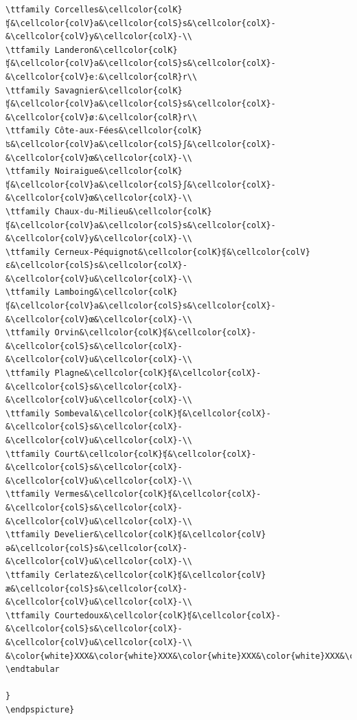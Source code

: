 \begin{verbatim}
\ttfamily Corcelles&\cellcolor{colK}ʧ&\cellcolor{colV}a&\cellcolor{colS}s&\cellcolor{colX}-&\cellcolor{colV}y&\cellcolor{colX}-\\
\ttfamily Landeron&\cellcolor{colK}ʧ&\cellcolor{colV}a&\cellcolor{colS}s&\cellcolor{colX}-&\cellcolor{colV}eː&\cellcolor{colR}r\\
\ttfamily Savagnier&\cellcolor{colK}ʧ&\cellcolor{colV}a&\cellcolor{colS}s&\cellcolor{colX}-&\cellcolor{colV}øː&\cellcolor{colR}r\\
\ttfamily Côte-aux-Fées&\cellcolor{colK}ʦ&\cellcolor{colV}a&\cellcolor{colS}ʃ&\cellcolor{colX}-&\cellcolor{colV}œ&\cellcolor{colX}-\\
\ttfamily Noiraigue&\cellcolor{colK}ʧ&\cellcolor{colV}a&\cellcolor{colS}ʃ&\cellcolor{colX}-&\cellcolor{colV}œ&\cellcolor{colX}-\\
\ttfamily Chaux-du-Milieu&\cellcolor{colK}ʧ&\cellcolor{colV}a&\cellcolor{colS}s&\cellcolor{colX}-&\cellcolor{colV}y&\cellcolor{colX}-\\
\ttfamily Cerneux-Péquignot&\cellcolor{colK}ʧ&\cellcolor{colV}ɛ&\cellcolor{colS}s&\cellcolor{colX}-&\cellcolor{colV}u&\cellcolor{colX}-\\
\ttfamily Lamboing&\cellcolor{colK}ʧ&\cellcolor{colV}a&\cellcolor{colS}s&\cellcolor{colX}-&\cellcolor{colV}œ&\cellcolor{colX}-\\
\ttfamily Orvin&\cellcolor{colK}ʧ&\cellcolor{colX}-&\cellcolor{colS}s&\cellcolor{colX}-&\cellcolor{colV}u&\cellcolor{colX}-\\
\ttfamily Plagne&\cellcolor{colK}ʧ&\cellcolor{colX}-&\cellcolor{colS}s&\cellcolor{colX}-&\cellcolor{colV}u&\cellcolor{colX}-\\
\ttfamily Sombeval&\cellcolor{colK}ʧ&\cellcolor{colX}-&\cellcolor{colS}s&\cellcolor{colX}-&\cellcolor{colV}u&\cellcolor{colX}-\\
\ttfamily Court&\cellcolor{colK}ʧ&\cellcolor{colX}-&\cellcolor{colS}s&\cellcolor{colX}-&\cellcolor{colV}u&\cellcolor{colX}-\\
\ttfamily Vermes&\cellcolor{colK}ʧ&\cellcolor{colX}-&\cellcolor{colS}s&\cellcolor{colX}-&\cellcolor{colV}u&\cellcolor{colX}-\\
\ttfamily Develier&\cellcolor{colK}ʧ&\cellcolor{colV}ə&\cellcolor{colS}s&\cellcolor{colX}-&\cellcolor{colV}u&\cellcolor{colX}-\\
\ttfamily Cerlatez&\cellcolor{colK}ʧ&\cellcolor{colV}æ&\cellcolor{colS}s&\cellcolor{colX}-&\cellcolor{colV}u&\cellcolor{colX}-\\
\ttfamily Courtedoux&\cellcolor{colK}ʧ&\cellcolor{colX}-&\cellcolor{colS}s&\cellcolor{colX}-&\cellcolor{colV}u&\cellcolor{colX}-\\
&\color{white}XXX&\color{white}XXX&\color{white}XXX&\color{white}XXX&\color{white}XXX&\color{white}XXX\\
\endtabular

}
\endpspicture}
\end{verbatim}

